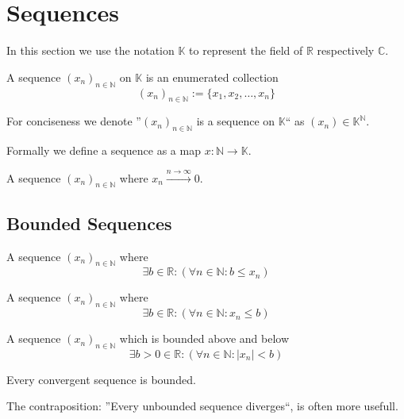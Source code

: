 \section{Sequences}
In this section we use the notation \(\mathbb{K}\) to represent the field of \(\mathbb{R}\) respectively \(\mathbb{C}\).

\begin{definition}[Sequence]
   A sequence \((x_n)_{n \in \mathbb{N}}\) on \(\mathbb{K}\) is an enumerated collection
   \[(x_n)_{n \in \mathbb{N}} := \{x_1, x_2, \ldots, x_n\}\]
\end{definition}
\begin{remark}[Notation]
   For conciseness we denote ''\((x_n)_{n \in \mathbb{N}}\) is a sequence on \(\mathbb{K}\)`` as \((x_n) \in \mathbb{K}^\mathbb{N}\).
\end{remark}
\begin{remark}
   Formally we define a sequence as a map \(x: \mathbb{N} \to \mathbb{K}\).
\end{remark}

\begin{definition}
   A sequence \((x_n)_{n \in \mathbb{N}}\) where \(x_n \xrightarrow{n \to \infty} 0\).
\end{definition}

\subsection{Bounded Sequences}
\begin{definition}
   A sequence \((x_n)_{n \in \mathbb{N}}\) where
   \[\exists b \in \mathbb{R}: (\forall n \in \mathbb{N}: b \leq x_n)\]
\end{definition}

\begin{definition}
   A sequence \((x_n)_{n \in \mathbb{N}}\) where
   \[\exists b \in \mathbb{R}: (\forall n \in \mathbb{N}: x_n \leq b)\]
\end{definition}

\begin{definition}
   A sequence \((x_n)_{n \in \mathbb{N}}\) which is bounded above and below
   \[\exists b > 0 \in \mathbb{R}: (\forall n \in \mathbb{N}: |x_n| < b)\]
\end{definition}

\begin{theorem}\label{thm:conv_bound}
   Every convergent sequence is bounded.
\end{theorem}
\begin{remark}
   The contraposition: ''Every unbounded sequence diverges``, is often more usefull.
\end{remark}

